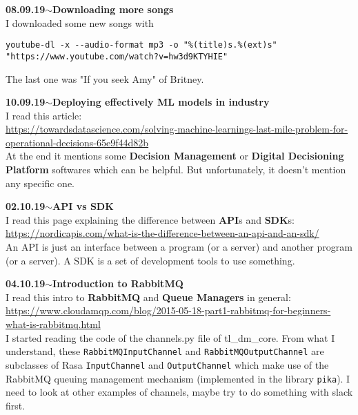 \documentclass[11pt,a4paper]{article}
\newenvironment{loggentry}[2]%
{\noindent\textbf{#1}\hspace{1cm}$\mathbf{\sim}$\text{ }\textbf{#2}\\}{\vspace{0.5cm}}
\begin{document}
\begin{loggentry}{08.09.19}{Downloading more songs}

I downloaded some new songs with
\begin{verbatim}
youtube-dl -x --audio-format mp3 -o "%(title)s.%(ext)s" "https://www.youtube.com/watch?v=hw3d9KTYHIE"
\end{verbatim}

The last one was "If you seek Amy" of Britney.

\end{loggentry}


\begin{loggentry}{10.09.19}{Deploying effectively ML models in industry}

I read this article:\\
\url{https://towardsdatascience.com/solving-machine-learnings-last-mile-problem-for-operational-decisions-65e9f44d82b}\\
At the end it mentions some \textbf{Decision Management} or \textbf{Digital Decisioning Platform} softwares which can be helpful. But unfortunately, it doesn't mention any specific one.

\end{loggentry}


\begin{loggentry}{02.10.19}{API vs SDK}

I read this page explaining the difference between \textbf{API}s and \textbf{SDK}s:\\
\url{https://nordicapis.com/what-is-the-difference-between-an-api-and-an-sdk/}\\
An API is just an interface between a program (or a server) and another program (or a server). A SDK is a set of development tools to use something.

\end{loggentry}


\begin{loggentry}{04.10.19}{Introduction to RabbitMQ}

I read this intro to \textbf{RabbitMQ} and \textbf{Queue Managers} in general:\\
\url{https://www.cloudamqp.com/blog/2015-05-18-part1-rabbitmq-for-beginners-what-is-rabbitmq.html}\\

I started reading the code of the channels.py file of tl\_dm\_core. From what I understand, these \texttt{RabbitMQInputChannel} and \texttt{RabbitMQOutputChannel} are subclasses of Rasa \texttt{InputChannel} and \texttt{OutputChannel} which make use of the RabbitMQ queuing management mechanism (implemented in the library \texttt{pika}). I need to look at other examples of channels, maybe try to do something with slack first.

\end{loggentry}
\end{document}
